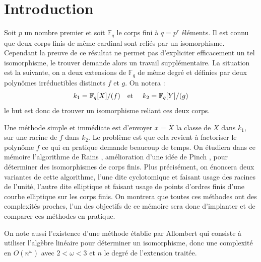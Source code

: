 \documentclass[a4paper]{article} %
\numberwithin{section}{part}
\numberwithin{equation}{section}
\newcommand\GF[1]{\mathbb{F}_{#1}}
\newcommand\etmath{\textup{\quad et \quad}}
\begin{document}
\part*{Introduction}
Soit $p$ un nombre premier et soit $\GF{q}$ le corps fini à $q = p^r$ éléments. 
Il est connu que deux corps finis de même cardinal sont reliés par un 
isomorphisme. Cependant la preuve de ce résultat ne permet pas d'expliciter
efficacement un tel isomorphisme, le trouver demande alors un travail 
supplémentaire. La situation est la suivante, on a deux extensions de 
$\GF{q}$ de même degré et définies par deux polynômes irréductibles distincts 
$f$ et $g$. On notera :
\[k_1=\GF{q}[X]/(f)\etmath k_2=\GF{q}[Y]/(g)\]
le but est donc de trouver un isomorphisme reliant ces deux corps.\par
Une méthode simple et immédiate est d'envoyer $x = \bar{X}$ la classe de $X$
dans $k_1$, sur une racine de $f$ dans $k_2$. Le problème est que cela revient à
factoriser le polynôme $f$ ce qui en pratique demande beaucoup de temps. On 
étudiera dans ce mémoire l'algorithme de Rains \cite{Rai}, amélioration d'une 
idée de Pinch \cite{Pin}, pour déterminer des isomorphismes de corps finis. Plus
précisément, on énoncera deux variantes de cette algorithme, l'une dite 
cyclotomique et faisant usage des racines de l'unité, l'autre dite elliptique et
faisant usage de points d'ordres finis d'une courbe elliptique sur les corps 
finis. On montrera que toutes ces méthodes ont des complexités proches, l'un des
objectifs de ce mémoire sera donc d'implanter et de comparer ces méthodes en 
pratique.\par
On note aussi l'existence d'une méthode établie par Allombert \cite{All} qui 
consiste à utiliser l'algèbre linéaire pour déterminer un isomorphisme, donc une
complexité en $O(n^{\omega})$ avec $2<\omega<3$ et $n$ le degré de l'extension
traitée.\par
\newpage
\end{document}
